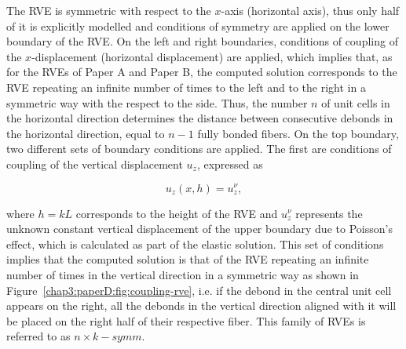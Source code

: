 The RVE is symmetric with respect to the $x$-axis (horizontal axis), thus only half of it is explicitly modelled and conditions of symmetry are applied on the lower boundary of the RVE. On the left and right boundaries, conditions of coupling of the $x$-displacement (horizontal displacement) are applied, which implies that, as for the RVEs of Paper A and Paper B, the computed solution corresponds to the RVE repeating an infinite number of times to the left and to the right in a symmetric way with the respect to the side. Thus, the number $n$ of unit cells in the horizontal direction determines the distance between consecutive debonds in the horizontal direction, equal to $n-1$ fully bonded fibers. On the top boundary, two different sets of boundary conditions are applied. The first are conditions of coupling of the vertical displacement $u_{z}$, expressed as

\begin{equation}
u_{z}\left(x,h\right)=u_{z}^{\nu},
\end{equation}

where $h=kL$ corresponds to the height of the RVE and $u_{z}^{\nu}$ represents the unknown constant vertical displacement of the upper boundary due to Poisson's effect, which is calculated as part of the elastic solution. This set of conditions implies that the computed solution is that of the RVE repeating an infinite number of times in the vertical direction in a symmetric way as shown in Figure~\ref{chap3:paperD:fig:coupling-rve}, i.e. if the debond in the central unit cell appears on the right, all the debonds in the vertical direction aligned with it will be placed on the right half of their respective fiber. This family of RVEs is referred to as $n\times k-symm$.

